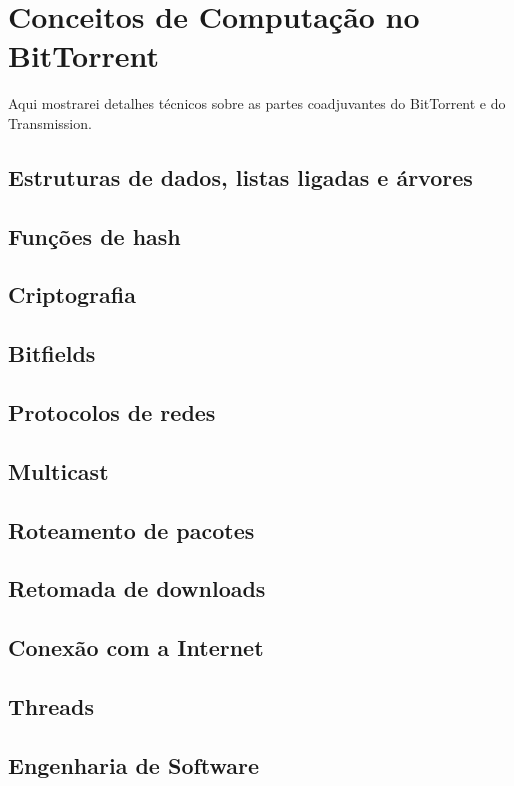 
\chapter{Conceitos de Computação no BitTorrent}

Aqui mostrarei detalhes técnicos sobre as partes coadjuvantes do BitTorrent e do Transmission.


\section{Estruturas de dados, listas ligadas e árvores}
\section{Funções de hash} %
\section{Criptografia} %
\section{Bitfields}
\section{Protocolos de redes} %
\section{Multicast}
\section{Roteamento de pacotes} %
\section{Retomada de downloads}
\section{Conexão com a Internet}
\section{Threads}
\section{Engenharia de Software}

\clearpage
